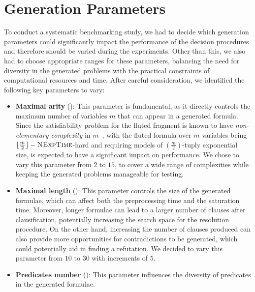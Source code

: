 \section{Generation Parameters}\label{sec:generation-parameters}

To conduct a systematic benchmarking study, we had to decide which generation parameters could significantly impact the performance of the decision procedures and therefore should be varied during the experiments.
Other than this, we also had to choose appropriate ranges for these parameters, balancing the need for diversity in the generated problems with the practical constraints of computational resources and time.
After careful consideration, we identified the following key parameters to vary:
\begin{itemize}
\item \textbf{Maximal arity} ():  This parameter is fundamental, as it directly controls the maximum number of variables \(m\) that can appear in a generated formula.
                                                  Since the satisfiability problem for the fluted fragment is known to have \emph{non-elementary complexity} in \(m\)~\cite{pratt2019fluted}, with the fluted formula over \(m\) variables being
                                                   \(\lfloor \frac{m}{2} \rfloor-\textsc{NExpTime}\)-hard and requiring models of \((\frac{m}{2})\)-tuply exponential size,  is expected to have a significant impact on performance.
                                                  We chose to vary this parameter from \(2\) to \(15\), to cover a wide range of complexities while keeping the generated problems manageable for testing.
\item \textbf{Maximal length} (): This parameter controls the size of the generated formulae, which can affect both the preprocessing time and the saturation time.
                                                Moreover, longer formulae can lead to a larger number of clauses after clausification, potentially increasing the search space for the resolution procedure.
                                                On the other hand, increasing the number of clauses produced can also provide more opportunities for contradictions to be generated, which could potentially aid in finding a refutation.
                                                We decided to vary this parameter from \(10\) to \(30\) with increments of \(5\).
\item \textbf{Predicates number} (): This parameter influences the diversity of predicates in the generated formulae.

\end{itemize}
